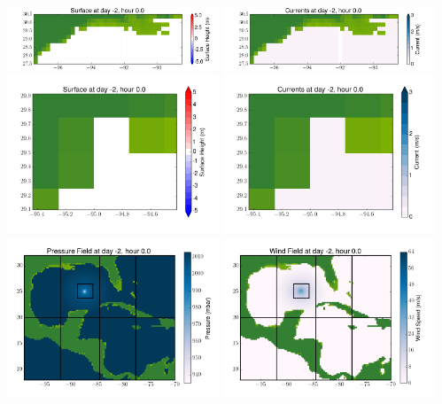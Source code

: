 \documentclass[11pt]{article}
\begin{document}
\includegraphics[width=0.475\textwidth]{frame0004fig4.png}
\vskip 10pt 
\includegraphics[width=0.475\textwidth]{frame0004fig5.png}
\includegraphics[width=0.475\textwidth]{frame0004fig6.png}
\vskip 10pt 
\includegraphics[width=0.475\textwidth]{frame0004fig7.png}
\includegraphics[width=0.475\textwidth]{frame0004fig8.png}
\vskip 10pt 
\includegraphics[width=0.475\textwidth]{frame0004fig9.png}
\end{document}
